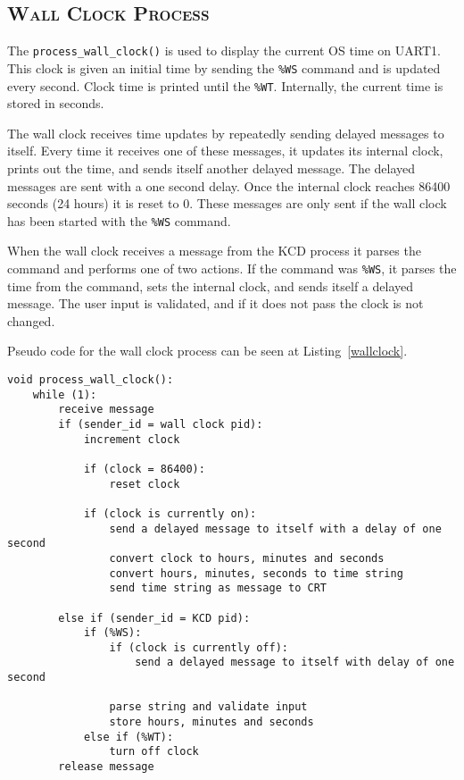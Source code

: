 \documentclass[oneside]{report}
\begin{document}
\subsection{\textsc{Wall Clock Process}}
The \texttt{process\_wall\_clock()} is used to display the current OS
time on UART1. This clock is given an initial time by sending the
\texttt{\%WS} command and is updated every second. Clock time is printed
until the \texttt{\%WT}. Internally, the current time is stored in seconds.

The wall clock receives time updates by repeatedly sending delayed
messages to itself. Every time it receives one of these messages, it
updates its internal clock, prints out the time, and sends itself
another delayed message. The delayed messages are sent with a one
second delay. Once the internal clock reaches 86400 seconds (24 hours)
it is reset to 0. These messages are only sent if the wall clock has
been started with the \texttt{\%WS} command.

When the wall clock receives a message from the KCD process it parses
the command and performs one of two actions. If the command was
\texttt{\%WS}, it parses the time from the command, sets the internal
clock, and sends itself a delayed message. The user input is
validated, and if it does not pass the clock is not changed.

Pseudo code for the wall clock process can be seen at
Listing~\ref{wallclock}.

\begin{lstlisting}
void process_wall_clock():
    while (1):
        receive message
        if (sender_id = wall clock pid):
            increment clock

            if (clock = 86400):
                reset clock

            if (clock is currently on):
                send a delayed message to itself with a delay of one second
                convert clock to hours, minutes and seconds
                convert hours, minutes, seconds to time string
                send time string as message to CRT

        else if (sender_id = KCD pid):
            if (%WS):
                if (clock is currently off):
                    send a delayed message to itself with delay of one second

                parse string and validate input
                store hours, minutes and seconds
            else if (%WT):
                turn off clock
        release message
\end{lstlisting}
\end{document}
